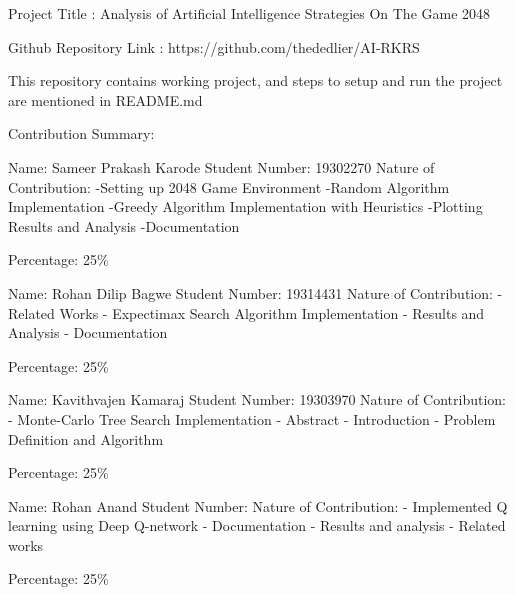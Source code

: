 \documentclass{svproc}
\begin{document}
Project Title : Analysis of Artificial Intelligence Strategies On The Game 2048

Github Repository Link : https://github.com/thededlier/AI-RKRS

This repository contains working project, and steps to setup and run the project are mentioned in README.md


Contribution Summary:


Name: Sameer Prakash Karode
Student Number: 19302270
Nature of Contribution: 
	-Setting up 2048 Game Environment
	-Random Algorithm Implementation
	-Greedy Algorithm Implementation with Heuristics
	-Plotting Results and Analysis
	-Documentation

Percentage: 25\%


Name: Rohan Dilip Bagwe
Student Number: 19314431
Nature of Contribution: 
	- Related Works
	- Expectimax Search Algorithm Implementation
	- Results and Analysis
	- Documentation

Percentage: 25\%


Name: Kavithvajen Kamaraj
Student Number: 19303970
Nature of Contribution: 
	- Monte-Carlo Tree Search Implementation
	- Abstract
	- Introduction
	- Problem Definition and Algorithm

Percentage: 25\%



Name: Rohan Anand
Student Number: 
Nature of Contribution: 
	- Implemented Q learning using Deep Q-network
    - Documentation
    - Results and analysis
    - Related works
    
Percentage: 25\%
\end{document}

